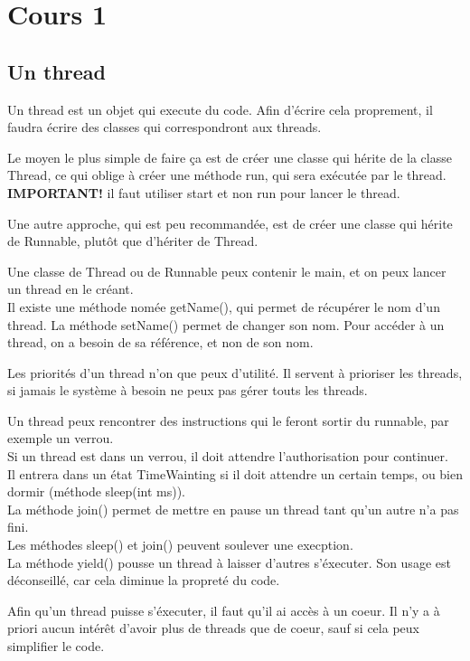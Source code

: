 \section{Cours 1}
\subsection{Un thread}
Un thread est un objet qui execute du code. Afin d'écrire cela proprement, il faudra écrire des classes qui
correspondront aux threads.

Le moyen le plus simple de faire ça est de créer une classe qui hérite de la classe Thread, ce qui oblige à créer
une méthode run, qui sera exécutée par le thread.
\textbf{IMPORTANT!} il faut utiliser start et non run pour lancer le thread.

Une autre approche, qui est peu recommandée, est de créer une classe qui hérite de Runnable, plutôt que d'hériter de
Thread.

Une classe de Thread ou de Runnable peux contenir le main, et on peux lancer un thread en le créant.\\
Il existe une méthode nomée getName(), qui permet de récupérer le nom d'un thread. La méthode setName() permet
de changer son nom. Pour accéder à un thread, on a besoin de sa référence, et non de son nom.

Les priorités d'un thread n'on que peux d'utilité. Il servent à prioriser les threads, si jamais le système à besoin
ne peux pas gérer touts les threads.

Un thread peux rencontrer des instructions qui le feront sortir du runnable, par exemple un verrou.\\
Si un thread est dans un verrou, il doit attendre l'authorisation pour continuer.\\
Il entrera dans un état TimeWainting si il doit attendre un certain temps, ou bien dormir (méthode sleep(int ms)).\\

La méthode join() permet de mettre en pause un thread tant qu'un autre n'a pas fini.\\
Les méthodes sleep() et join() peuvent soulever une execption.\\
La méthode yield() pousse un thread à laisser d'autres s'éxecuter. Son usage est déconseillé, car cela diminue
la propreté du code.

Afin qu'un thread puisse s'éxecuter, il faut qu'il ai accès à un coeur. Il n'y a à priori aucun intérêt d'avoir plus
de threads que de coeur, sauf si cela peux simplifier le code.

